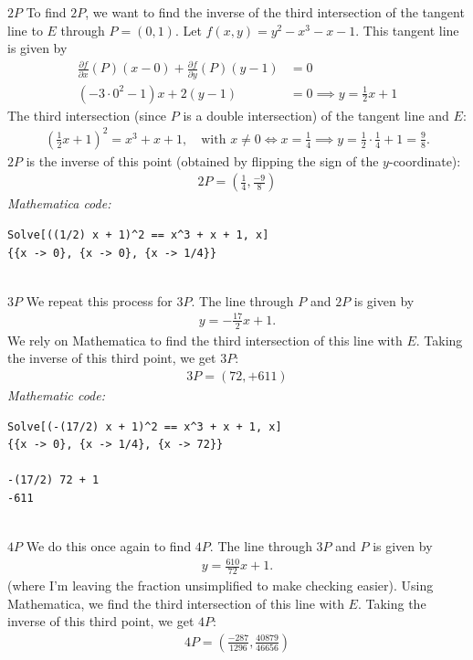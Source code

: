 \documentclass[12pt]{article}
\newcommand{\p}{\partial}
\newcommand{\nn}{\nonumber}
\newcommand{\f}[2]{\frac{#1}{#2}}
\newcommand{\lp}{\left(}
\newcommand{\rp}{\right)}
\begin{document}
\noindent $\boxed{2P}$ To find $2P$, we want to find the inverse of the third intersection of the tangent line to $E$ through $P=(0,1)$. Let $f(x,y) = y^2 - x^3 - x - 1$. This tangent line is given by
\begin{align*}
\f{\p f}{\p x}(P)(x-0) + \f{\p f}{\p y}(P)(y-1) &= 0\nn\\
(-3\cdot 0^2-1)x + 2(y-1) &= 0 \implies {y = \f{1}{2}x + 1}
\end{align*}
The third intersection (since $P$ is a double intersection) of the tangent line and $E$:
\begin{align*}
\lp \f{1}{2}x + 1 \rp^2 = x^3 + x + 1, \quad \text{with }x\neq 0 \iff  x = \f{1}{4} \implies y = \f{1}{2}\cdot\f{1}{4} + 1 = \f{9}{8}.
\end{align*}
$2P$ is the inverse of this point (obtained by flipping the sign of the $y$-coordinate):
\begin{align*}
\boxed{2P = \lp \f{1}{4}, \f{-9}{8} \rp}
\end{align*}
\noindent\textit{Mathematica code:}
\begin{lstlisting}
Solve[((1/2) x + 1)^2 == x^3 + x + 1, x]
{{x -> 0}, {x -> 0}, {x -> 1/4}}
\end{lstlisting}
$\,$\\
\noindent $\boxed{3P}$ We repeat this process for $3P$. The line through $P$ and $2P$ is given by
\begin{align*}
y = -\f{17}{2}x + 1.
\end{align*}
We rely on Mathematica to find the third intersection of this line with $E$. Taking the inverse of this third point, we get $3P$:
\begin{align*}
\boxed{3P =  \lp 72, +611 \rp}
\end{align*}
\noindent \textit{Mathematic code:}
\begin{lstlisting}
Solve[(-(17/2) x + 1)^2 == x^3 + x + 1, x]
{{x -> 0}, {x -> 1/4}, {x -> 72}}

-(17/2) 72 + 1
-611
\end{lstlisting}
$\,$\\
\noindent $\boxed{4P}$ We do this once again to find $4P$. The line through $3P$ and $P$ is given by
\begin{align*}
y =  \f{610}{72}x + 1.
\end{align*}
(where I'm leaving the fraction unsimplified to make checking easier). Using Mathematica, we find the third intersection of this line with $E$. Taking the inverse of this third point, we get $4P$:
\begin{align*}
\boxed{ 4P =\lp \f{-287}{1296}, \f{40879}{46656} \rp }
\end{align*}
\end{document}
